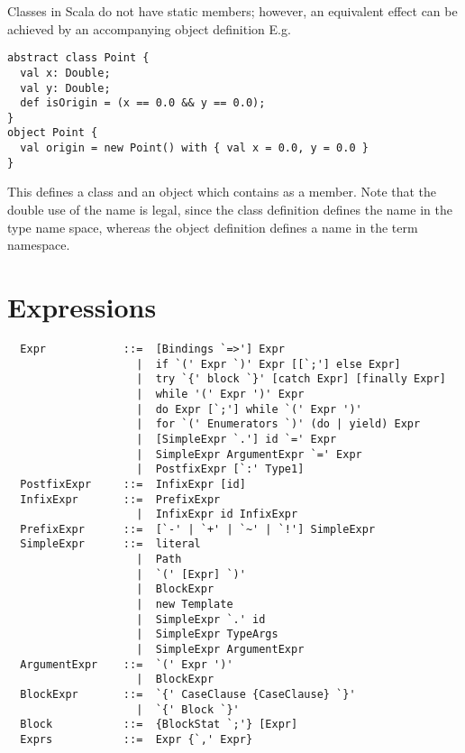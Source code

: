 \documentclass[a4paper,12pt,twoside,titlepage]{book}
\begin{document}
\example
Classes in Scala do not have static members; however, an equivalent
effect can be achieved by an accompanying object definition
E.g.
\begin{lstlisting}
abstract class Point {
  val x: Double;
  val y: Double;
  def isOrigin = (x == 0.0 && y == 0.0);
}
object Point {
  val origin = new Point() with { val x = 0.0, y = 0.0 }
}
\end{lstlisting}
This defines a class  and an object  which
contains  as a member.  Note that the double use of the
name  is legal, since the class definition defines the name
 in the type name space, whereas the object definition
defines a name in the term namespace.


\chapter{Expressions}
\label{sec:exprs}

\syntax\begin{lstlisting}
  Expr            ::=  [Bindings `=>'] Expr
                    |  if `(' Expr `)' Expr [[`;'] else Expr]
                    |  try `{' block `}' [catch Expr] [finally Expr]
                    |  while '(' Expr ')' Expr
                    |  do Expr [`;'] while `(' Expr ')'
                    |  for `(' Enumerators `)' (do | yield) Expr
                    |  [SimpleExpr `.'] id `=' Expr
                    |  SimpleExpr ArgumentExpr `=' Expr
                    |  PostfixExpr [`:' Type1]
  PostfixExpr     ::=  InfixExpr [id]
  InfixExpr       ::=  PrefixExpr
                    |  InfixExpr id InfixExpr
  PrefixExpr      ::=  [`-' | `+' | `~' | `!'] SimpleExpr 
  SimpleExpr      ::=  literal
                    |  Path
                    |  `(' [Expr] `)'
                    |  BlockExpr
                    |  new Template 
                    |  SimpleExpr `.' id 
                    |  SimpleExpr TypeArgs
                    |  SimpleExpr ArgumentExpr
  ArgumentExpr    ::=  `(' Expr ')'
                    |  BlockExpr
  BlockExpr       ::=  `{' CaseClause {CaseClause} `}'
                    |  `{' Block `}'
  Block           ::=  {BlockStat `;'} [Expr]
  Exprs           ::=  Expr {`,' Expr}
\end{lstlisting}
\end{document}

